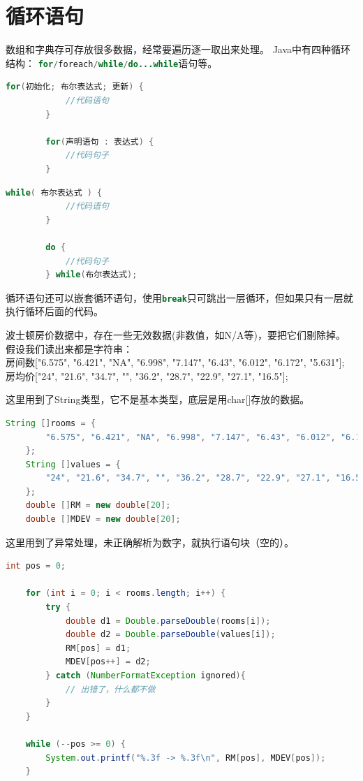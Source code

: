 \section{循环语句}
	数组和字典存可存放很多数据，经常要遍历逐一取出来处理。
	Java中有四种循环结构：
	\lstinline[language=Java]{for/foreach/while/do...while}语句等。

	\begin{minipage}[t]{0.45\textwidth}
	\begin{lstlisting}[language=Java]
		for(初始化; 布尔表达式; 更新) {
			//代码语句
		}

		for(声明语句 : 表达式) {
			//代码句子
		}
	\end{lstlisting}
	\end{minipage}
	\quad
	\begin{minipage}[t]{0.4\textwidth}
	\begin{lstlisting}[language=Java]
		while( 布尔表达式 ) {  
			//代码语句
		}

		do {
			//代码句子
		} while(布尔表达式);
	\end{lstlisting}
	\end{minipage}
	
	\noindent
	循环语句还可以嵌套循环语句，使用\lstinline[language=Java]{break}只可跳出一层循环，但如果只有一层就执行循环后面的代码。
	\bigskip

	\begin{example}
		波士顿房价数据中，存在一些无效数据(非数值，如N/A等)，要把它们剔除掉。
		假设我们读出来都是字符串：\\
		房间数["6.575", "6.421", "NA", "6.998", "7.147", "6.43", "6.012", "6.172", "5.631"];\\
		房均价["24", "21.6", "34.7", "", "36.2", "28.7", "22.9", "27.1", "16.5"];
	\end{example}

\noindent
这里用到了String类型，它不是基本类型，底层是用char[]存放的数据。
\begin{lstlisting}[language=Java]
	String []rooms = {
		"6.575", "6.421", "NA", "6.998", "7.147", "6.43", "6.012", "6.172", "5.631"
	};
	String []values = {
		"24", "21.6", "34.7", "", "36.2", "28.7", "22.9", "27.1", "16.5"
	};
	double []RM = new double[20];
	double []MDEV = new double[20];
\end{lstlisting}

\noindent
这里用到了异常处理，未正确解析为数字，就执行语句块（空的）。
\begin{lstlisting}[language=Java]
	int pos = 0;

	for (int i = 0; i < rooms.length; i++) {
		try {
			double d1 = Double.parseDouble(rooms[i]);
			double d2 = Double.parseDouble(values[i]);
			RM[pos] = d1;
			MDEV[pos++] = d2;
		} catch (NumberFormatException ignored){
			// 出错了，什么都不做
		}
	}

	while (--pos >= 0) {
		System.out.printf("%.3f -> %.3f\n", RM[pos], MDEV[pos]);
	}
\end{lstlisting}

